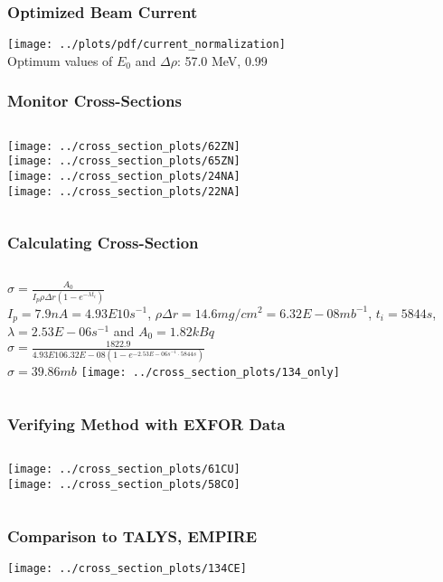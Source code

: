 \documentclass[12pt,xcolor=dvipsnames]{beamer}
\begin{document}
\begin{frame}
\frametitle{Optimized Beam Current}
\texttt{[image: ../plots/pdf/current\_normalization]}
\\
Optimum values of $E_0$ and $\Delta \rho$: 57.0 MeV, 0.99
\end{frame}

\begin{frame}
\frametitle{Monitor Cross-Sections}
\begin{columns}[c]
\column{2.5in}
\texttt{[image: ../cross\_section\_plots/62ZN]}
\\
\texttt{[image: ../cross\_section\_plots/65ZN]}
\\
\column{2.5in}
\texttt{[image: ../cross\_section\_plots/24NA]}
\\
\texttt{[image: ../cross\_section\_plots/22NA]}
\\
\end{columns}
\end{frame}

\begin{frame}
\frametitle{Calculating Cross-Section}

\begin{columns}[c]
\column{2.5in}
$\sigma = \frac{A_0}{I_p \rho \Delta r (1-e^{-\lambda t_i})}$\\
$I_p = 7.9 nA = 4.93E10 s^{-1}$, $\rho \Delta r = 14.6 mg/cm^2 = 6.32E-08 mb^{-1}$,
$t_i = 5844 s$, $\lambda = 2.53E-06 s^{-1}$ and $A_0 = 1.82 kBq$\\
$\sigma = \frac{1822.9}{4.93E10 6.32E-08 (1-e^{-2.53E-06s^{-1}\cdot 5844 s})}$\\
$\sigma = 39.86mb$
\column{2.0in}
\texttt{[image: ../cross\_section\_plots/134\_only]}
\end{columns}
\end{frame}

\begin{frame}
\frametitle{Verifying Method with EXFOR Data}
\begin{columns}[c]
\column{2.5in}
\texttt{[image: ../cross\_section\_plots/61CU]}
\\
\column{2.5in}
\texttt{[image: ../cross\_section\_plots/58CO]}
\\
\end{columns}
\end{frame}

\begin{frame}
\frametitle{Comparison to TALYS, EMPIRE}
\texttt{[image: ../cross\_section\_plots/134CE]}
\end{frame}
\end{document}
